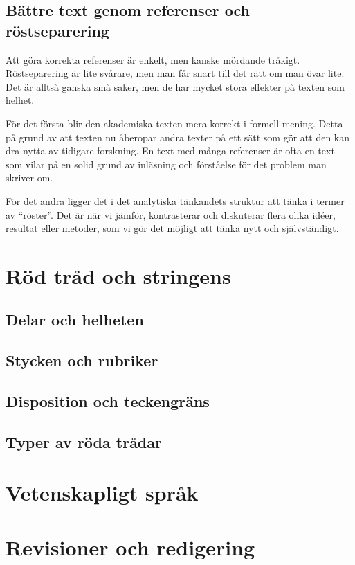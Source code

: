 \documentclass[11pt,a5paper,footinclude=true,headinclude=true]{scrbook} %
\begin{document}
\section{Bättre text genom referenser och röstseparering}

Att göra korrekta referenser är enkelt, men kanske mördande tråkigt. Röstseparering är lite svårare, men man får snart till det rätt om man övar lite. Det är alltså ganska små saker, men de har mycket stora effekter på texten som helhet. 

För det första blir den akademiska texten mera korrekt i formell mening. Detta på grund av att texten nu åberopar andra texter på ett sätt som gör att den kan dra nytta av tidigare forskning. En text med många referenser är ofta en text som vilar på en solid grund av inläsning och förståelse för det problem man skriver om. 

För det andra ligger det i det analytiska tänkandets struktur att tänka i termer av ``röster''. Det är när vi jämför, kontrasterar och diskuterar flera olika idéer, resultat eller metoder, som vi gör det möjligt att tänka nytt och självständigt. 

    
    \chapter{Röd tråd och stringens}


\section{Delar och helheten}



\section{Stycken och rubriker}

\section{Disposition och teckengräns}

\section{Typer av röda trådar}
        
    \chapter{Vetenskapligt språk}
            
    \chapter{Revisioner och redigering}
    
    
\printbibliography
\end{document}
